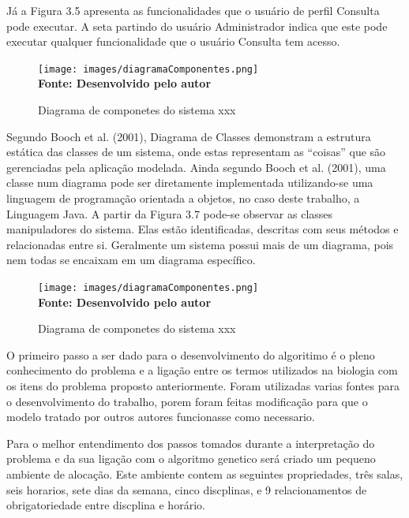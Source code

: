 Já a Figura 3.5 apresenta as funcionalidades que o usuário de perfil Consulta pode
executar. A seta partindo do usuário Administrador indica que este pode executar qualquer
funcionalidade que o usuário Consulta tem acesso.

\begin{figure}[!htb]
\caption[Diagrama de componetes do sistema xxx]{Diagrama de componetes do sistema xxx}
\label{fig:figura1}
\centering
\texttt{[image: images/diagramaComponentes.png]}
\\ \textbf{\footnotesize Fonte: Desenvolvido pelo autor}
\end{figure}




Segundo Booch et al. (2001), Diagrama de Classes demonstram a estrutura estática
das classes de um sistema, onde estas representam as “coisas” que são gerenciadas pela
aplicação modelada. Ainda segundo Booch et al. (2001), uma classe num diagrama pode
ser diretamente implementada utilizando-se uma linguagem de programação orientada a
objetos, no caso deste trabalho, a Linguagem Java.
A partir da Figura 3.7 pode-se observar as classes manipuladores do sistema. Elas
estão identificadas, descritas com seus métodos e relacionadas entre si. Geralmente um
sistema possui mais de um diagrama, pois nem todas se encaixam em um diagrama
específico.

\begin{figure}[!htb]
\caption[Diagrama de componetes do sistema xxx]{Diagrama de componetes do sistema xxx}
\label{fig:figura1}
\centering
\texttt{[image: images/diagramaComponentes.png]}
\\ \textbf{\footnotesize Fonte: Desenvolvido pelo autor}
\end{figure}



O primeiro passo a ser dado para o desenvolvimento do algoritimo é o pleno conhecimento do problema e a ligação entre os termos utilizados na biologia com os itens do problema proposto anteriormente. Foram utilizadas varias fontes para o desenvolvimento do trabalho, porem foram feitas modificação para que o modelo tratado por outros autores funcionasse como necessario.\par

Para o melhor entendimento dos passos tomados durante a interpretação do problema e da sua ligação com o algoritmo genetico será criado um pequeno ambiente de alocação. Este ambiente contem as seguintes propriedades, três salas, seis horarios, sete dias da semana, cinco discplinas, e 9 relacionamentos de obrigatoriedade entre discplina e horário.\par

